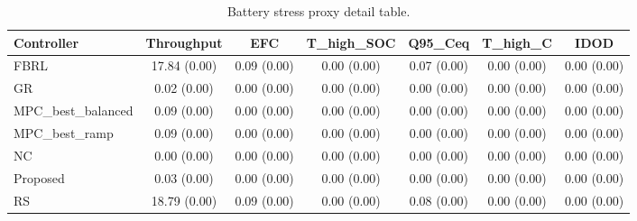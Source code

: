 \begin{table}[t]
\centering
\caption{Battery stress proxy detail table.}
\label{tab:stress_proxy_auto}
\begin{tabular}{lcccccc}
\toprule
Controller & Throughput & EFC & T\_high\_SOC & Q95\_Ceq & T\_high\_C & IDOD \\
\midrule
FBRL & 17.84 (0.00) & 0.09 (0.00) & 0.00 (0.00) & 0.07 (0.00) & 0.00 (0.00) & 0.00 (0.00) \\
GR & 0.02 (0.00) & 0.00 (0.00) & 0.00 (0.00) & 0.00 (0.00) & 0.00 (0.00) & 0.00 (0.00) \\
MPC\_best\_balanced & 0.09 (0.00) & 0.00 (0.00) & 0.00 (0.00) & 0.00 (0.00) & 0.00 (0.00) & 0.00 (0.00) \\
MPC\_best\_ramp & 0.09 (0.00) & 0.00 (0.00) & 0.00 (0.00) & 0.00 (0.00) & 0.00 (0.00) & 0.00 (0.00) \\
NC & 0.00 (0.00) & 0.00 (0.00) & 0.00 (0.00) & 0.00 (0.00) & 0.00 (0.00) & 0.00 (0.00) \\
Proposed & 0.03 (0.00) & 0.00 (0.00) & 0.00 (0.00) & 0.00 (0.00) & 0.00 (0.00) & 0.00 (0.00) \\
RS & 18.79 (0.00) & 0.09 (0.00) & 0.00 (0.00) & 0.08 (0.00) & 0.00 (0.00) & 0.00 (0.00) \\
\bottomrule
\end{tabular}
\end{table}